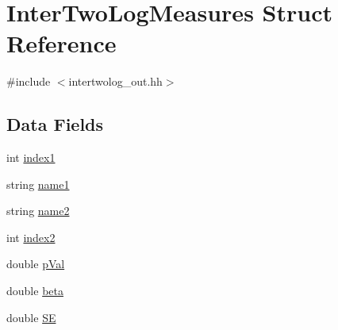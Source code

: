 \hypertarget{structInterTwoLogMeasures}{
\section{InterTwoLogMeasures Struct Reference}
\label{structInterTwoLogMeasures}
}


{\ttfamily \#include $<$intertwolog\_\-out.hh$>$}

\subsection*{Data Fields}
\begin{DoxyCompactItemize}
\item 
int \hyperlink{structInterTwoLogMeasures_a94b6a0b09c1c97b3d0125ddc76628448}{index1}
\item 
string \hyperlink{structInterTwoLogMeasures_a8de68e6596ff089ceb961142efd1511f}{name1}
\item 
string \hyperlink{structInterTwoLogMeasures_ae2674bca1f6256b7ffee69a6753223fa}{name2}
\item 
int \hyperlink{structInterTwoLogMeasures_af119c8d5a38d1c9be1e27298d34c3fe4}{index2}
\item 
double \hyperlink{structInterTwoLogMeasures_acc51a0307cefa7e90cac00b59e73c492}{pVal}
\item 
double \hyperlink{structInterTwoLogMeasures_ae0e2cfc789fa924b472556e5bb9e3412}{beta}
\item 
double \hyperlink{structInterTwoLogMeasures_a30ea64299ac79791bf47cda86b350fdd}{SE}
\end{DoxyCompactItemize}


